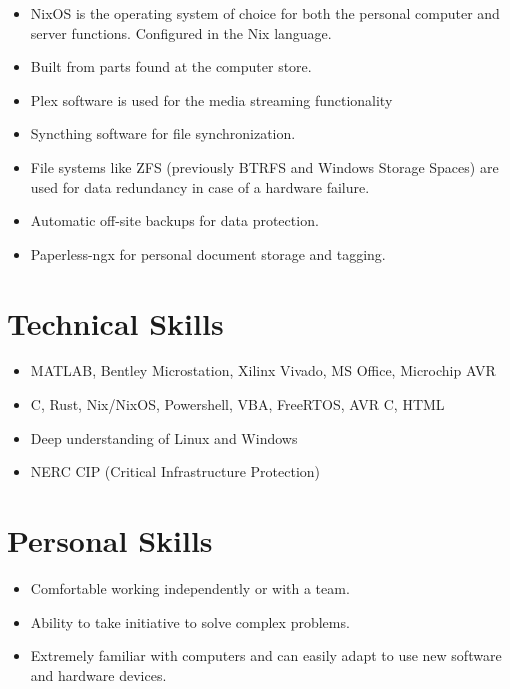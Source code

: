 \documentclass{lsanche_cv}
\begin{document}
\begin{multicols*}{2}
      \begin{itemize}
        \item NixOS is the operating system of choice for both the personal computer and server functions. Configured in the Nix language.
        \item Built from parts found at the computer store.
        \item Plex software is used for the media streaming functionality
        \item Syncthing software for file synchronization.
				\item File systems like ZFS (previously BTRFS and Windows Storage Spaces) are used for data redundancy in case of a hardware failure.
				\item Automatic off-site backups for data protection.
				\item Paperless-ngx for personal document storage and tagging.
      \end{itemize}

    \section{Technical Skills}
      \begin{itemize}
        \item MATLAB, Bentley Microstation, Xilinx Vivado, MS Office, Microchip AVR
        \item C, Rust, Nix/NixOS, Powershell, VBA, FreeRTOS, AVR C, HTML
        \item Deep understanding of Linux and Windows
        \item NERC CIP (Critical Infrastructure Protection)
      \end{itemize}
    
    \section{Personal Skills}
      \begin{itemize}
        \item Comfortable working independently or with a team.
        \item Ability to take initiative to solve complex problems.
        \item Extremely familiar with computers and can easily adapt to use new software and hardware devices.
      \end{itemize}
\end{multicols*}
\end{document}
